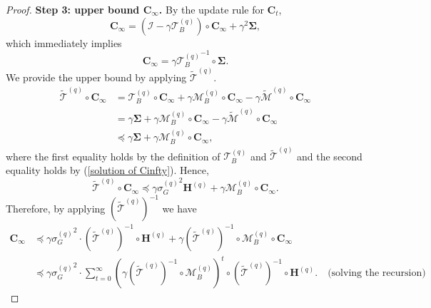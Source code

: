 \documentclass[11pt, letterpaper]{article}
\begin{document}
\begin{proof}
    \textbf{Step 3: upper bound $\mathbf{C}_\infty$.} By the update rule for $\mathbf{C}_t$,
    \begin{equation*}
        \mathbf{C}_\infty=(\mathcal{I}-\gamma\mathcal{T}_B^{(q)})\circ\mathbf{C}_\infty+\gamma^2\boldsymbol{\Sigma},
    \end{equation*}
    which immediately implies 
    \begin{equation}
    \label{solution of Cinfty}
        \mathbf{C}_\infty=\gamma{\mathcal{T}_B^{(q)}}^{-1}\circ\mathbf{\Sigma}.
    \end{equation}
    We provide the upper bound by applying $\widetilde{\mathcal{T}}^{(q)}$.
    \begin{equation*}
        \begin{aligned}
            \widetilde{\mathcal{T}}^{(q)}\circ\mathbf{C}_{\infty} & =\mathcal{T}_B^{(q)}\circ\mathbf{C}_{\infty}+\gamma\mathcal{M}_B^{(q)}\circ\mathbf{C}_{\infty}-\gamma\widetilde{\mathcal{M}}^{(q)}\circ\mathbf{C}_{\infty} \\
            & =\gamma\boldsymbol{\Sigma}+\gamma\mathcal{M}_B^{(q)}\circ\mathbf{C}_\infty-\gamma\widetilde{\mathcal{M}}^{(q)}\circ\mathbf{C}_\infty\\
            & \preceq\gamma\boldsymbol{\Sigma}+\gamma\mathcal{M}_B^{(q)}\circ\mathbf{C}_\infty,
        \end{aligned}
    \end{equation*}
    where the first equality holds by the definition of $\mathcal{T}_B^{(q)}$ and $\widetilde{\mathcal{T}}^{(q)}$ and the second equality holds by (\ref{solution of Cinfty}).
    Hence,
    \begin{equation*}
        \widetilde{\mathcal{T}}^{(q)}\circ\mathbf{C}_{\infty}\preceq \gamma{\sigma_G^{(q)}}^2\mathbf{H}^{(q)}+\gamma\mathcal{M}_B^{(q)}\circ\mathbf{C}_\infty.
    \end{equation*}
    Therefore, by applying $(\widetilde{\mathcal{T}}^{(q)})^{-1}$ we have
    \begin{equation}
    \label{202020}
        \begin{aligned}
            \mathbf{C}_{\infty} & \preceq\gamma{\sigma_G^{(q)}}^2\cdot(\widetilde{\mathcal{T}}^{(q)})^{-1}\circ\mathbf{H}^{(q)}+\gamma(\widetilde{\mathcal{T}}^{(q)})^{-1}\circ\mathcal{M}_B^{(q)}\circ\mathbf{C}_\infty \\
            & \preceq\gamma{\sigma_G^{(q)}}^2\cdot\sum_{t=0}^\infty\left(\gamma(\widetilde{\mathcal{T}}^{(q)})^{-1}\circ\mathcal{M}_B^{(q)}\right)^t\circ(\widetilde{\mathcal{T}}^{(q)})^{-1}\circ\mathbf{H}^{(q)}.\quad\text{(solving the recursion)}

\end{aligned}
\end{equation}
\end{proof}
\end{document}
